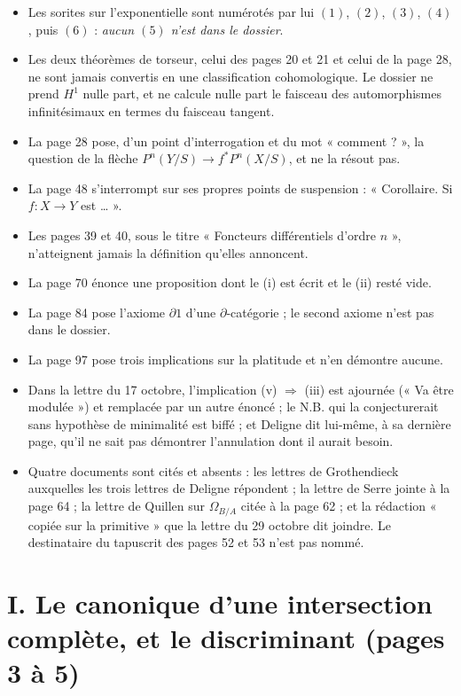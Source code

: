 \documentclass[11pt,a4paper]{article}
\begin{document}
\begin{itemize}
  \item Les sorites sur l'exponentielle sont numérotés par lui $(1)$, $(2)$,
  $(3)$, $(4)$, puis $(6)$ : \emph{aucun $(5)$ n'est dans le dossier}.
  \item Les deux théorèmes de torseur, celui des pages 20 et 21 et celui de la
  page 28, ne sont jamais convertis en une classification cohomologique. Le
  dossier ne prend $H^{1}$ nulle part, et ne calcule nulle part le faisceau des
  automorphismes infinitésimaux en termes du faisceau tangent.
  \item La page 28 pose, d'un point d'interrogation et du mot « comment ? », la
  question de la flèche $P^{n}(Y/S) \to f^{*}P^{n}(X/S)$, et ne la résout pas.
  \item La page 48 s'interrompt sur ses propres points de suspension :
  « Corollaire. Si $f : X \to Y$ est … ».
  \item Les pages 39 et 40, sous le titre « Foncteurs différentiels d'ordre
  $n$ », n'atteignent jamais la définition qu'elles annoncent.
  \item La page 70 énonce une proposition dont le (i) est écrit et le (ii)
  resté vide.
  \item La page 84 pose l'axiome $\partial 1$ d'une $\partial$-catégorie ; le
  second axiome n'est pas dans le dossier.
  \item La page 97 pose trois implications sur la platitude et n'en démontre
  aucune.
  \item Dans la lettre du 17 octobre, l'implication (v) $\Rightarrow$ (iii) est
  ajournée (« Va être modulée ») et remplacée par un autre énoncé ; le N.B.
  qui la conjecturerait sans hypothèse de minimalité est biffé ; et Deligne dit
  lui-même, à sa dernière page, qu'il ne sait pas démontrer l'annulation dont il
  aurait besoin.
  \item Quatre documents sont cités et absents : les lettres de Grothendieck
  auxquelles les trois lettres de Deligne répondent ; la lettre de Serre jointe
  à la page 64 ; la lettre de Quillen sur $\Omega_{B/A}$ citée à la page 62 ; et
  la rédaction « copiée sur la primitive » que la lettre du 29 octobre dit
  joindre. Le destinataire du tapuscrit des pages 52 et 53 n'est pas nommé.
\end{itemize}

\section*{I. Le canonique d'une intersection complète, et le discriminant (pages 3 à 5)}
\end{document}
